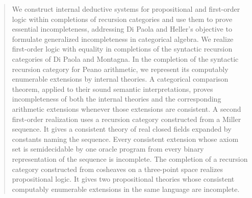 \begin{abstract}
We construct internal deductive systems for propositional and first-order
logic within completions of recursion categories and use them to prove
essential incompleteness, addressing Di Paola and Heller's objective to
formulate generalized incompleteness in categorical algebra.
We realize first-order logic with equality in completions of the syntactic
recursion categories of Di Paola and Montagna. In the completion of the
syntactic recursion category for Peano arithmetic, we represent its
computably enumerable extensions by internal theories. A categorical
comparison theorem, applied to their sound semantic interpretations, proves
incompleteness of both the internal theories and the corresponding arithmetic
extensions whenever those extensions are consistent.
A second first-order realization uses a recursion category constructed
from a Miller sequence. It gives a consistent theory of real closed fields
expanded by constants naming the sequence. Every consistent extension whose
axiom set is semidecidable by one oracle program from every binary
representation of the sequence is incomplete.
The completion of a recursion category constructed from cosheaves on a
three-point space realizes propositional logic. It gives two propositional
theories whose consistent computably enumerable extensions in the same
language are incomplete.
\end{abstract}
